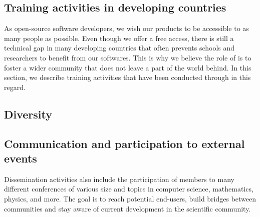 \documentclass{deliverablereport}
\begin{document}












\subsection{Training activities in developing countries}

As open-source software developers, we wish our products
to be accessible to as many people as possible. Even though we offer
 a free access, there is still a technical gap in many 
developing countries that 
often prevents schools and researchers to benefit from our softwares.
This is why we believe the role of \ODK is to foster 
a wider community that does not leave a part of the world behind. In 
this section, we describe training activities that have been conducted 
through \ODK in this regard.









\subsection{Diversity}









\subsection{Communication and participation to external events}

Dissemination activities also include the participation of \ODK
members to many different conferences of various size and topics
in computer science, mathematics, physics, and more. The goal is
to reach potential end-users, build bridges between communities and stay aware 
of current development in the scientific community.
\end{document}
